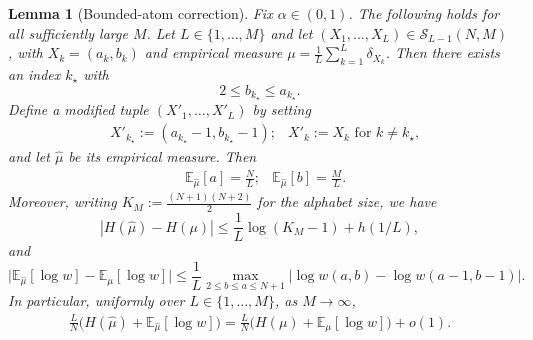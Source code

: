 \documentclass[11pt]{amsart}
\numberwithin{equation}{section}
\numberwithin{equation}{section}
\newcommand{\1}{\mathbbm{1}}
\newcommand{\E}{\mathbb{E}}
\newtheorem{lemma}[theorem]{Lemma}
\theoremstyle{definition}
\begin{document}
\begin{lemma}[Bounded-atom correction]\label{lem:one-atom-correction}
Fix $\alpha \in (0,1)$. The following holds for all sufficiently large $M$. Let $L\in\{1,\dots,M\}$ and let $(X_1,\dots,X_L) \in \mathcal S_{L-1}(N,M)$, with $X_k=(a_k,b_k)$ and empirical measure $\mu=\frac1L\sum_{k=1}^L\delta_{X_k}$. Then there exists an index $k_\star$ with
\begin{equation}\label{eq:bounded-good-atom}
    2\le b_{k_\star} \leq a_{k_\star}.
\end{equation}
Define a modified tuple $\left( X'_1,\dots,X'_L \right)$ by setting
\begin{align*}
    & X'_{k_\star} := \left(a_{k_\star}-1,b_{k_\star}-1\right);
    & X'_k := X_k \text{ for } k\neq k_\star,
\end{align*}
and let $\widehat\mu$ be its empirical measure. Then
\begin{align*}
    & \E_{\widehat\mu}[a]=\frac{N}{L};
    & \E_{\widehat\mu}[b]=\frac{M}{L}.
\end{align*}
Moreover, writing $K_M:=\frac{(N+1)(N+2)}2$ for the alphabet size, we have
\begin{equation}\label{eq:correction-entropy-bound}
    \left| H(\widehat\mu) - H(\mu) \right| \leq \frac{1}{L} \log(K_M-1)+h\left( 1/L \right),
\end{equation}
and
\begin{equation}\label{eq:correction-logw-bound}
    \Big|\E_{\widehat\mu}[\log w]-\E_{\mu}[\log w]\Big| \leq \frac{1}{L}\max_{2\le b\le a\le N+1}\Big|\log w(a,b)-\log w(a-1,b-1)\Big|.
\end{equation}
In particular, uniformly over $L\in\{1,\dots,M\}$, as $M\to\infty$,
\begin{align} \label{eq:one-atom-correction-uniform-bd}
    \frac{L}{N}\Big(H(\widehat\mu)+\E_{\widehat\mu}[\log w]\Big)
    = \frac{L}{N}\Big(H(\mu)+\E_\mu[\log w]\Big)+o(1).
\end{align}
\end{lemma}
\end{document}
